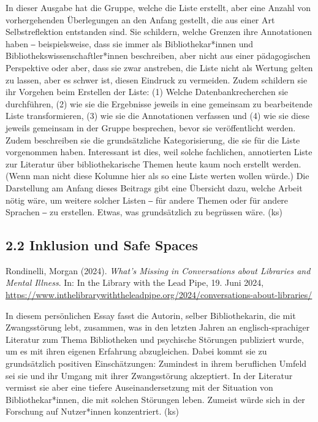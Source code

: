 \documentclass[a4paper,
fontsize=11pt,
oneside,
numbers=noperiodatend,
parskip=half-,
bibliography=totoc,
final
]{scrartcl}
\begin{document}
In dieser Ausgabe hat die Gruppe, welche die Liste erstellt, aber eine
Anzahl von vorhergehenden Überlegungen an den Anfang gestellt, die aus
einer Art Selbstreflektion entstanden sind. Sie schildern, welche
Grenzen ihre Annotationen haben ‒ beispielsweise, dass sie immer als
Bibliothekar*innen und Bibliothekswissenschaftler*innen beschreiben,
aber nicht aus einer pädagogischen Perspektive oder aber, dass sie zwar
anstreben, die Liste nicht als Wertung gelten zu lassen, aber es schwer
ist, diesen Eindruck zu vermeiden. Zudem schildern sie ihr Vorgehen beim
Erstellen der Liste: (1) Welche Datenbankrecherchen sie durchführen, (2)
wie sie die Ergebnisse jeweils in eine gemeinsam zu bearbeitende Liste
transformieren, (3) wie sie die Annotationen verfassen und (4) wie sie
diese jeweils gemeinsam in der Gruppe besprechen, bevor sie
veröffentlicht werden. Zudem beschreiben sie die grundsätzliche
Kategorisierung, die sie für die Liste vorgenommen haben. Interessant
ist dies, weil solche fachlichen, annotierten Liste zur Literatur über
bibliothekarische Themen heute kaum noch erstellt werden. (Wenn man
nicht diese Kolumne hier als so eine Liste werten wollen würde.) Die
Darstellung am Anfang dieses Beitrags gibt eine Übersicht dazu, welche
Arbeit nötig wäre, um weitere solcher Listen ‒ für andere Themen oder
für andere Sprachen ‒ zu erstellen. Etwas, was grundsätzlich zu
begrüssen wäre. (ks)

\hypertarget{inklusion-und-safe-spaces}{%
\subsection{2.2 Inklusion und Safe
Spaces}\label{inklusion-und-safe-spaces}}

Rondinelli, Morgan (2024). \emph{What's Missing in Conversations about
Libraries and Mental Illness}. In: In the Library with the Lead Pipe,
19. Juni 2024,
\url{https://www.inthelibrarywiththeleadpipe.org/2024/conversations-about-libraries/}

In diesem persönlichen Essay fasst die Autorin, selber Bibliothekarin,
die mit Zwangsstörung lebt, zusammen, was in den letzten Jahren an
englisch-sprachiger Literatur zum Thema Bibliotheken und psychische
Störungen publiziert wurde, um es mit ihren eigenen Erfahrung
abzugleichen. Dabei kommt sie zu grundsätzlich positiven Einschätzungen:
Zumindest in ihrem beruflichen Umfeld sei sie und ihr Umgang mit ihrer
Zwangsstörung akzeptiert. In der Literatur vermisst sie aber eine
tiefere Auseinandersetzung mit der Situation von Bibliothekar*innen, die
mit solchen Störungen leben. Zumeist würde sich in der Forschung auf
Nutzer*innen konzentriert. (ks)
\end{document}
